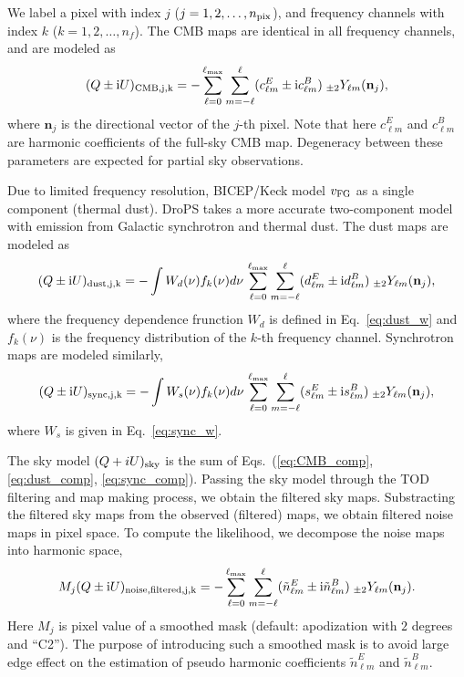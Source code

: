 \documentclass[12pt, a4paper]{ctexart} %
\begin{document}
We label a pixel with index $j$ ($j=1, 2, \ldots, n_{\rm pix}$), and frequency channels with index $k$ ($k = 1, 2, \ldots, n_f$). The CMB maps are identical in all frequency channels, and are modeled as
\begin{equation}
  (Q\pm \mathrm{i}U)_{\rm CMB, j, k} = -\sum_{\ell = 0}^{\ell_{\max}}\sum_{m=-\ell}^\ell (c_{\ell m}^E\pm \mathrm{i} c_{\ell m}^B)\;_{\pm 2}Y_{\ell m}(\mathbf{n}_j), \label{eq:CMB_comp}
\end{equation}
where $\mathbf{n}_j$ is the directional vector of the $j$-th pixel. Note that here $c_{\ell m}^E$ and $c_{\ell m}^B$ are harmonic coefficients of the full-sky CMB map. Degeneracy between these parameters are expected for partial sky observations. 

Due to limited frequency resolution, BICEP/Keck model $v_{\rm FG}$ as a single component (thermal dust). DroPS takes a more accurate two-component model with emission from Galactic synchrotron and thermal dust. The dust maps are modeled as
\begin{equation}
  (Q\pm \mathrm{i}U)_{\rm dust, j, k} =  -\int W_d(\nu) f_k(\nu) d\nu \,\sum_{\ell = 0}^{\ell_{\max}}\sum_{m=-\ell}^\ell (d_{\ell m}^E\pm \mathrm{i}  d_{\ell m}^B)\;_{\pm 2}Y_{\ell m}(\mathbf{n}_j),  \label{eq:dust_comp}
\end{equation}
where the frequency dependence frunction $W_d$ is defined in Eq.~\eqref{eq:dust_w} and $f_k(\nu)$ is the frequency distribution of the $k$-th frequency channel.
Synchrotron maps are modeled similarly,
\begin{equation}
  (Q\pm \mathrm{i}U)_{\rm sync, j, k} =  -\int W_s(\nu) f_k(\nu) d\nu \,\sum_{\ell = 0}^{\ell_{\max}}\sum_{m=-\ell}^\ell (s_{\ell m}^E\pm \mathrm{i}  s_{\ell m}^B)\;_{\pm 2}Y_{\ell m}(\mathbf{n}_j),  \label{eq:sync_comp}
\end{equation}
where $W_s$ is given in Eq.~\eqref{eq:sync_w}.

The sky model $(Q+iU)_{\rm sky}$ is the sum of Eqs.~(\ref{eq:CMB_comp}, \ref{eq:dust_comp}, \ref{eq:sync_comp}). Passing the sky model through the TOD filtering and map making process, we obtain the filtered sky maps. Substracting the filtered sky maps from the observed (filtered) maps, we obtain filtered noise maps in pixel space. To compute the likelihood, we decompose the noise maps into harmonic space,
\begin{equation}
   M_j(Q\pm \mathrm{i}U)_{\rm noise, filtered, j, k} = -\sum_{\ell = 0}^{\ell_{\max}}\sum_{m=-\ell}^\ell (\tilde{n}_{\ell m}^E\pm \mathrm{i} \tilde{n}_{\ell m}^B)\;_{\pm 2}Y_{\ell m}(\mathbf{n}_j).
\end{equation}
Here $M_j$ is pixel value of a smoothed mask (default: apodization with $2$ degrees and ``C2''). The purpose of introducing such a smoothed mask is to avoid large edge effect on the estimation of pseudo harmonic coefficients $\tilde{n}_{\ell m}^E$ and $\tilde{n}_{\ell m}^B$.
\end{document}
